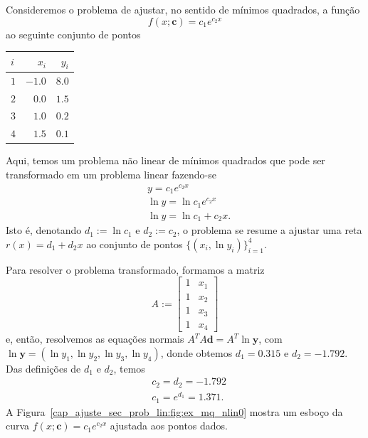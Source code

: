 \begin{ex}\label{cap_ajuste_sec_prob_lin:ex:mq_nlin0}
  Consideremos o problema de ajustar, no sentido de mínimos quadrados, a função
  \begin{equation}
    f(x; \pmb{c}) = c_1e^{c_2x}
  \end{equation}
  ao seguinte conjunto de pontos
  \begin{center}
    \begin{tabular}{lrr}
      $i$ & $x_i$ & $y_i$\\\hline
      $1$ & $-1.0$ & $8.0$\\
      $2$ &  $0.0$ & $1.5$\\
      $3$ &  $1.0$ & $0.2$\\
      $4$ &  $1.5$ & $0.1$\\\hline            
    \end{tabular}
  \end{center}

Aqui, temos um problema não linear de mínimos quadrados que pode ser transformado em um problema linear fazendo-se
\begin{align}
  &y = c_1e^{c_2x}\\
  &\ln y = \ln c_1e^{c_2x}\\
  &\ln y = \ln c_1 + c_2x.
\end{align}
Isto é, denotando $d_1 := \ln c_1$ e $d_2 := c_2$, o problema se resume a ajustar uma reta $r(x) = d_1 + d_2x$ ao conjunto de pontos $\{(x_i, \ln y_i)\}_{i=1}^4$. 

Para resolver o problema transformado, formamos a matriz
\begin{equation}
  A :=
  \begin{bmatrix}
    1 & x_1 \\
    1 & x_2 \\
    1 & x_3 \\
    1 & x_4
  \end{bmatrix}
\end{equation}
e, então, resolvemos as equações normais $A^TA\pmb{d} = A^T\ln\pmb{y}$, com $\ln\pmb{y} = (\ln y_1, \ln y_2, \ln y_3, \ln y_4)$, donde obtemos $d_1 = 0.315$ e $d_2 = -1.792$. Das definições de $d_1$ e $d_2$, temos
\begin{align}
  &c_2 = d_2 = -1.792\\
  &c_1 = e^{d_1} = 1.371.
\end{align}
A Figura~\ref{cap_ajuste_sec_prob_lin:fig:ex_mq_nlin0} mostra um esboço da curva $f(x; \pmb{c}) = c_1e^{c_2x}$ ajustada aos pontos dados.


\end{ex}

